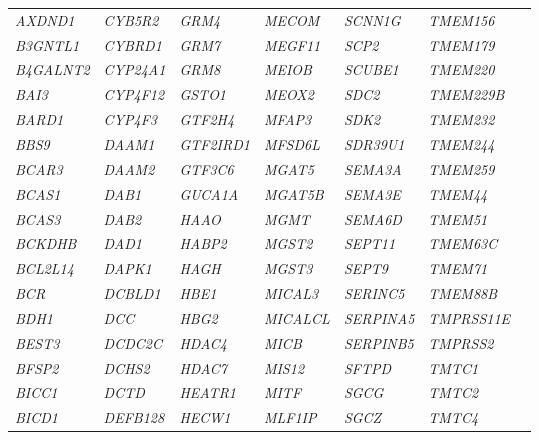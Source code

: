 \begin{refsection}
\begin{otherlanguage}{english}
\begin{scriptsize}
\begin{longtable}{lllllll}
\textit{AXDND1} & \textit{CYB5R2} & \textit{GRM4} & \textit{MECOM} & \textit{SCNN1G} & \textit{TMEM156} & \textit{} \\
\textit{B3GNTL1} & \textit{CYBRD1} & \textit{GRM7} & \textit{MEGF11} & \textit{SCP2} & \textit{TMEM179} & \textit{} \\
\textit{B4GALNT2} & \textit{CYP24A1} & \textit{GRM8} & \textit{MEIOB} & \textit{SCUBE1} & \textit{TMEM220} & \textit{} \\
\textit{BAI3} & \textit{CYP4F12} & \textit{GSTO1} & \textit{MEOX2} & \textit{SDC2} & \textit{TMEM229B} & \textit{} \\
\textit{BARD1} & \textit{CYP4F3} & \textit{GTF2H4} & \textit{MFAP3} & \textit{SDK2} & \textit{TMEM232} & \textit{} \\
\textit{BBS9} & \textit{DAAM1} & \textit{GTF2IRD1} & \textit{MFSD6L} & \textit{SDR39U1} & \textit{TMEM244} & \textit{} \\
\textit{BCAR3} & \textit{DAAM2} & \textit{GTF3C6} & \textit{MGAT5} & \textit{SEMA3A} & \textit{TMEM259} & \textit{} \\
\textit{BCAS1} & \textit{DAB1} & \textit{GUCA1A} & \textit{MGAT5B} & \textit{SEMA3E} & \textit{TMEM44} & \textit{} \\
\textit{BCAS3} & \textit{DAB2} & \textit{HAAO} & \textit{MGMT} & \textit{SEMA6D} & \textit{TMEM51} & \textit{} \\
\textit{BCKDHB} & \textit{DAD1} & \textit{HABP2} & \textit{MGST2} & \textit{SEPT11} & \textit{TMEM63C} & \textit{} \\
\textit{BCL2L14} & \textit{DAPK1} & \textit{HAGH} & \textit{MGST3} & \textit{SEPT9} & \textit{TMEM71} & \textit{} \\
\textit{BCR} & \textit{DCBLD1} & \textit{HBE1} & \textit{MICAL3} & \textit{SERINC5} & \textit{TMEM88B} & \textit{} \\
\textit{BDH1} & \textit{DCC} & \textit{HBG2} & \textit{MICALCL} & \textit{SERPINA5} & \textit{TMPRSS11E} & \textit{} \\
\textit{BEST3} & \textit{DCDC2C} & \textit{HDAC4} & \textit{MICB} & \textit{SERPINB5} & \textit{TMPRSS2} & \textit{} \\
\textit{BFSP2} & \textit{DCHS2} & \textit{HDAC7} & \textit{MIS12} & \textit{SFTPD} & \textit{TMTC1} & \textit{} \\
\textit{BICC1} & \textit{DCTD} & \textit{HEATR1} & \textit{MITF} & \textit{SGCG} & \textit{TMTC2} & \textit{} \\
\textit{BICD1} & \textit{DEFB128} & \textit{HECW1} & \textit{MLF1IP} & \textit{SGCZ} & \textit{TMTC4} & \textit{} \\

\end{longtable}
\end{scriptsize}
\end{otherlanguage}
\end{refsection}
